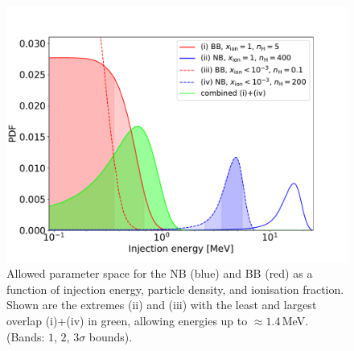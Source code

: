 \documentclass[doublespace,draft,nopageskip]{VTthesis} %
\begin{document}
	
	\begin{figure}
		\centering
		\includegraphics[width=0.8\columnwidth,trim=0.0in 0.25in 1.0in 0.9in, clip=true]{Figures/511keV/bulge_blur_Einj_pdfs_overlaps_combined.pdf}%
		\caption{Allowed parameter space for the NB (blue) and BB (red) as a function of injection energy, particle density, and ionisation fraction. Shown are the extremes (ii) and (iii) with the least and largest overlap (i)+(iv) in green, allowing energies up to $\approx 1.4$\,MeV. (Bands: $1$, $2$, $3\sigma$ bounds).}%
		\label{fig:limits_Einj}%
	\end{figure}
	
	
\end{document}
